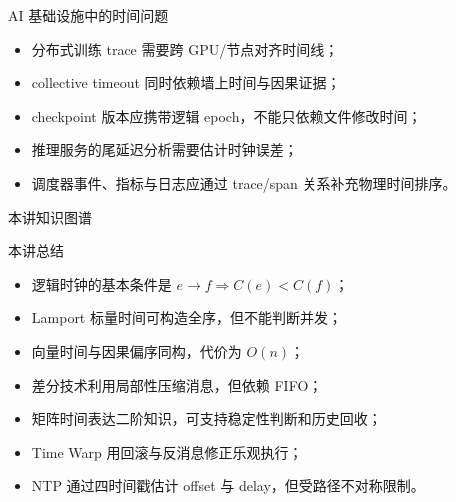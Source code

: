 \documentclass[UTF8,fontset=none,aspectratio=169,10pt]{beamer}
\begin{document}
\begin{frame}{AI 基础设施中的时间问题}
\begin{itemize}
  \item 分布式训练 trace 需要跨 GPU/节点对齐时间线；
  \item collective timeout 同时依赖墙上时间与因果证据；
  \item checkpoint 版本应携带逻辑 epoch，不能只依赖文件修改时间；
  \item 推理服务的尾延迟分析需要估计时钟误差；
  \item 调度器事件、指标与日志应通过 trace/span 关系补充物理时间排序。
\end{itemize}
\vfill
{}
\end{frame}

\begin{frame}{本讲知识图谱}
\begin{center}
\end{center}
\vfill
{}
\end{frame}

\begin{frame}{本讲总结}
\begin{itemize}
  \item 逻辑时钟的基本条件是 $e\rightarrow f\Rightarrow C(e)<C(f)$；
  \item Lamport 标量时间可构造全序，但不能判断并发；
  \item 向量时间与因果偏序同构，代价为 $O(n)$；
  \item 差分技术利用局部性压缩消息，但依赖 FIFO；
  \item 矩阵时间表达二阶知识，可支持稳定性判断和历史回收；
  \item Time Warp 用回滚与反消息修正乐观执行；
  \item NTP 通过四时间戳估计 offset 与 delay，但受路径不对称限制。
\end{itemize}
\end{frame}
\end{document}

